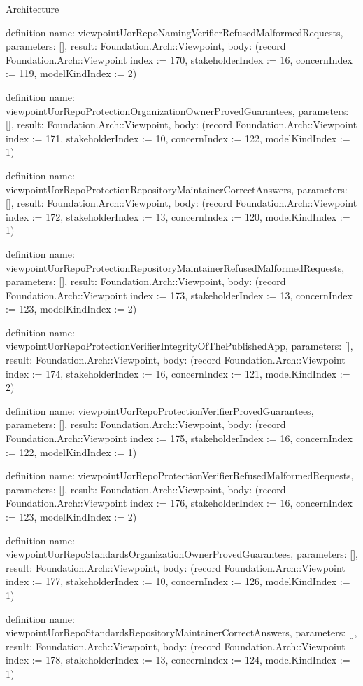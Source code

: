 \begin{lexlean}{Architecture}
\begin{semanticmodule}
definition{
  name: viewpointUorRepoNamingVerifierRefusedMalformedRequests,
  parameters: [],
  result: Foundation.Arch::Viewpoint,
  body: (record Foundation.Arch::Viewpoint {index := 170, stakeholderIndex := 16, concernIndex := 119, modelKindIndex := 2})
}

definition{
  name: viewpointUorRepoProtectionOrganizationOwnerProvedGuarantees,
  parameters: [],
  result: Foundation.Arch::Viewpoint,
  body: (record Foundation.Arch::Viewpoint {index := 171, stakeholderIndex := 10, concernIndex := 122, modelKindIndex := 1})
}

definition{
  name: viewpointUorRepoProtectionRepositoryMaintainerCorrectAnswers,
  parameters: [],
  result: Foundation.Arch::Viewpoint,
  body: (record Foundation.Arch::Viewpoint {index := 172, stakeholderIndex := 13, concernIndex := 120, modelKindIndex := 1})
}

definition{
  name: viewpointUorRepoProtectionRepositoryMaintainerRefusedMalformedRequests,
  parameters: [],
  result: Foundation.Arch::Viewpoint,
  body: (record Foundation.Arch::Viewpoint {index := 173, stakeholderIndex := 13, concernIndex := 123, modelKindIndex := 2})
}

definition{
  name: viewpointUorRepoProtectionVerifierIntegrityOfThePublishedApp,
  parameters: [],
  result: Foundation.Arch::Viewpoint,
  body: (record Foundation.Arch::Viewpoint {index := 174, stakeholderIndex := 16, concernIndex := 121, modelKindIndex := 2})
}

definition{
  name: viewpointUorRepoProtectionVerifierProvedGuarantees,
  parameters: [],
  result: Foundation.Arch::Viewpoint,
  body: (record Foundation.Arch::Viewpoint {index := 175, stakeholderIndex := 16, concernIndex := 122, modelKindIndex := 1})
}

definition{
  name: viewpointUorRepoProtectionVerifierRefusedMalformedRequests,
  parameters: [],
  result: Foundation.Arch::Viewpoint,
  body: (record Foundation.Arch::Viewpoint {index := 176, stakeholderIndex := 16, concernIndex := 123, modelKindIndex := 2})
}

definition{
  name: viewpointUorRepoStandardsOrganizationOwnerProvedGuarantees,
  parameters: [],
  result: Foundation.Arch::Viewpoint,
  body: (record Foundation.Arch::Viewpoint {index := 177, stakeholderIndex := 10, concernIndex := 126, modelKindIndex := 1})
}

definition{
  name: viewpointUorRepoStandardsRepositoryMaintainerCorrectAnswers,
  parameters: [],
  result: Foundation.Arch::Viewpoint,
  body: (record Foundation.Arch::Viewpoint {index := 178, stakeholderIndex := 13, concernIndex := 124, modelKindIndex := 1})
}


\end{semanticmodule}
\end{lexlean}
